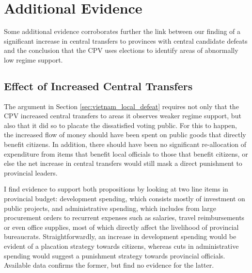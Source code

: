\documentclass[12pt]{article}
\newcommand{\1}{\mathbbm{1}}
\begin{document}
\section{Additional Evidence}
\label{sec:additional}

Some additional evidence corroborates further the link between our finding of a significant increase in central transfers to provinces with central candidate defeats and the conclusion that the CPV uses elections to identify areas of abnormally low regime support.

\subsection{Effect of Increased Central Transfers}

The argument in Section \ref{sec:vietnam_local_defeat} requires not only that the CPV increased central transfers to areas it observes weaker regime support, but also that it did so to placate the dissatisfied voting public. For this to happen, the increased flow of money should have been spent on public goods that directly benefit citizens. In addition, there should have been no significant re-allocation of expenditure from items that benefit local officials to those that benefit citizens, or else the net increase in central transfers would still mask a direct punishment to provincial leaders. 

I find evidence to support both propositions by looking at two line items in provincial budget: development spending, which consists mostly of investment on public projects, and administrative spending, which includes from large procurement orders to recurrent expenses such as salaries, travel reimbursements or even office supplies, most of which directly affect the livelihood of provincial bureaucrats. Straightforwardly, an increase in development spending would be evident of a placation strategy towards citizens, whereas cuts in administrative spending would suggest a punishment strategy towards provincial officials. Available data confirms the former, but find no evidence for the latter.


\end{document}
